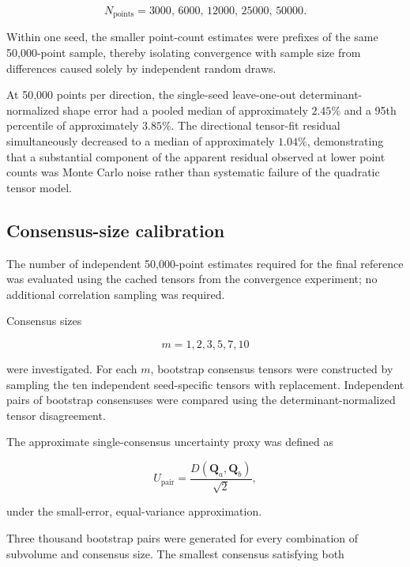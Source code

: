 \documentclass{article}
\begin{document}
\begin{equation}
N_{\mathrm{points}}
=
3000,\,
6000,\,
12000,\,
25000,\,
50000.
\end{equation}

Within one seed, the smaller point-count estimates were prefixes of the
same 50,000-point sample, thereby isolating convergence with sample size
from differences caused solely by independent random draws.

At 50,000 points per direction, the single-seed leave-one-out
determinant-normalized shape error had a pooled median of approximately
$2.45\%$ and a 95th percentile of approximately $3.85\%$. The
directional tensor-fit residual simultaneously decreased to a median of
approximately $1.04\%$, demonstrating that a substantial component of
the apparent residual observed at lower point counts was Monte Carlo
noise rather than systematic failure of the quadratic tensor model.

\subsection{Consensus-size calibration}
\label{sec:SI_consensus}

The number of independent 50,000-point estimates required for the final
reference was evaluated using the cached tensors from the convergence
experiment; no additional correlation sampling was required.

Consensus sizes

\begin{equation}
    m=1,2,3,5,7,10
\end{equation}

were investigated. For each $m$, bootstrap consensus tensors were
constructed by sampling the ten independent seed-specific tensors with
replacement. Independent pairs of bootstrap consensuses were compared
using the determinant-normalized tensor disagreement.

The approximate single-consensus uncertainty proxy was defined as

\begin{equation}
    U_{\mathrm{pair}}
    =
    \frac{
    D(\mathbf{Q}_a,\mathbf{Q}_b)
    }{\sqrt{2}},
\end{equation}

under the small-error, equal-variance approximation.

Three thousand bootstrap pairs were generated for every combination of
subvolume and consensus size. The smallest consensus satisfying both
\end{document}
